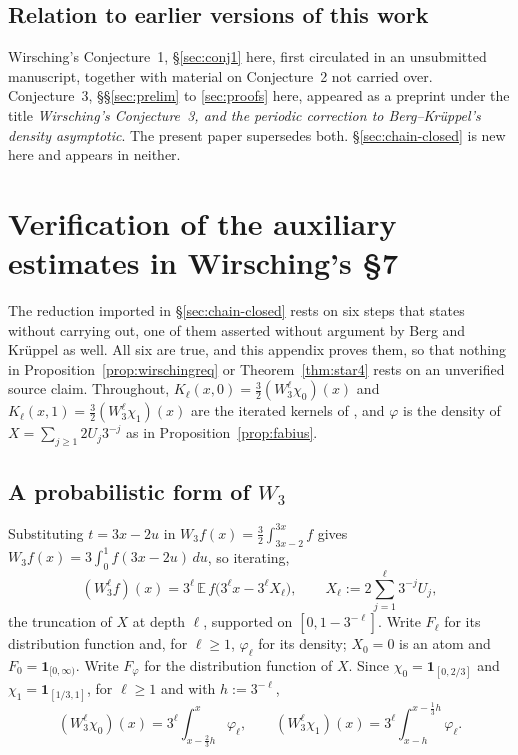 \documentclass[11pt]{article}
\theoremstyle{definition}
\theoremstyle{remark}
\begin{document}
\subsection*{Relation to earlier versions of this work}

Wirsching's Conjecture~1, \S\ref{sec:conj1} here, first circulated in
an unsubmitted manuscript, together with material on Conjecture~2 not
carried over. Conjecture~3, \S\S\ref{sec:prelim} to
\ref{sec:proofs} here, appeared as a preprint under the title
\emph{Wirsching's Conjecture~3, and the periodic correction to
Berg--Kr\"uppel's density asymptotic}. The present paper supersedes
both. \S\ref{sec:chain-closed} is new here and appears in neither.


\appendix

\section{Verification of the auxiliary estimates in Wirsching's \S7}
\label{app:sourcegaps}

The reduction imported in \S\ref{sec:chain-closed} rests on six steps
that \cite[\S7]{Wirsching2003} states without carrying out, one of them
asserted without argument by Berg and Kr\"uppel as well. All six are
true, and this appendix proves them, so that nothing in
Proposition~\ref{prop:wirschingreq} or Theorem~\ref{thm:star4} rests on
an unverified source claim. Throughout, $K_\ell(x,0)=\tfrac32(W_3^\ell
\chi_0)(x)$ and $K_\ell(x,1)=\tfrac32(W_3^\ell\chi_1)(x)$ are the
iterated kernels of \cite[\S7]{Wirsching2003}, and $\varphi$ is the
density of $X=\sum_{j\ge1}2U_j3^{-j}$ as in
Proposition~\ref{prop:fabius}.

\subsection*{A probabilistic form of \texorpdfstring{$W_3$}{W3}}

Substituting $t=3x-2u$ in $W_3f(x)=\tfrac32\int_{3x-2}^{3x}f$ gives
$W_3f(x)=3\int_0^1f(3x-2u)\,du$, so iterating,
\[
 (W_3^\ell f)(x)=3^\ell\,\mathbb E\,f\bigl(3^\ell x-3^\ell X_\ell\bigr),
 \qquad X_\ell:=2\sum_{j=1}^{\ell}3^{-j}U_j ,
\]
the truncation of $X$ at depth $\ell$, supported on
$[0,1-3^{-\ell}]$. Write $F_\ell$ for its distribution function and,
for $\ell\ge1$, $\varphi_\ell$ for its density; $X_0=0$ is an atom and
$F_0=\mathbf1_{[0,\infty)}$. Write $F_\varphi$ for the distribution
function of $X$. Since $\chi_0=\mathbf1_{[0,2/3]}$ and
$\chi_1=\mathbf1_{[1/3,1]}$, for $\ell\ge1$ and with $h:=3^{-\ell}$,
\begin{equation}\label{eq:kernwindow}
 (W_3^\ell\chi_0)(x)=3^\ell\!\!\int_{x-\frac23h}^{x}\!\!\varphi_\ell,
 \qquad
 (W_3^\ell\chi_1)(x)=3^\ell\!\!\int_{x-h}^{x-\frac13h}\!\!\varphi_\ell .
\end{equation}
\end{document}
